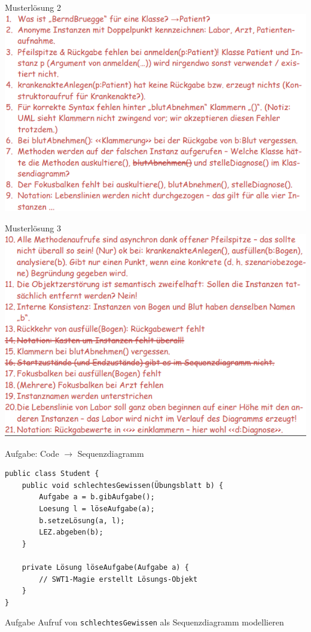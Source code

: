 \documentclass[18pt]{beamer}
\begin{document}
\begin{frame}{Musterlösung 2}
	\includegraphics[scale=0.65]{pics/tut2/solution-seq-l1.png}
\end{frame}

\begin{frame}{Musterlösung 3}
	\includegraphics[scale=0.65]{pics/tut2/solution-seq-l2.png}
\end{frame}

\begin{frame}[fragile]{Aufgabe: Code $\rightarrow$ Sequenzdiagramm}	
\begin{verbatim}
public class Student {
    public void schlechtesGewissen(Übungsblatt b) {
        Aufgabe a = b.gibAufgabe();
        Loesung l = löseAufgabe(a);
        b.setzeLösung(a, l);
        LEZ.abgeben(b);
    }
    
    private Lösung löseAufgabe(Aufgabe a) {
        // SWT1-Magie erstellt Lösungs-Objekt
    }
}
\end{verbatim}
\begin{block}{Aufgabe}
	Aufruf von \texttt{schlechtesGewissen} als Sequenzdiagramm modellieren
\end{block}
\end{frame}
\end{document}
